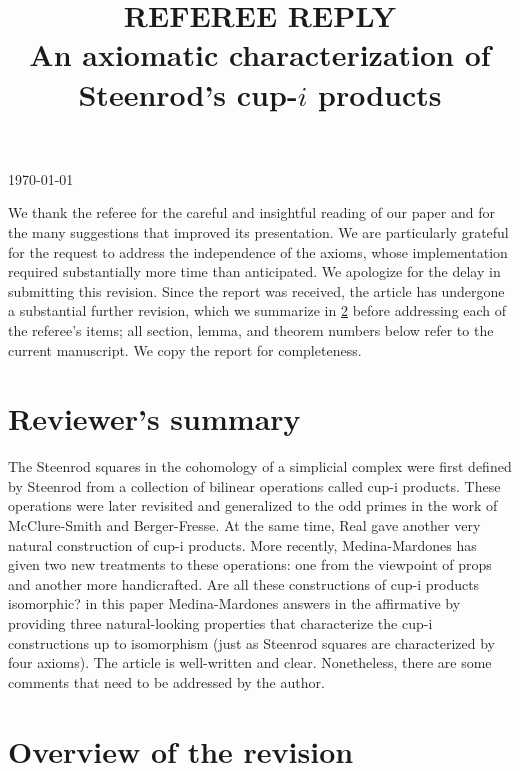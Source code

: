 \documentclass{amsart}
\title[Referee reply]{REFEREE REPLY \\ An axiomatic characterization of Steenrod's cup-$i$ products}
\begin{document}
	\noindent\today
	\maketitle

	We thank the referee for the careful and insightful reading of our paper and for the many suggestions that improved its presentation.
	We are particularly grateful for the request to address the independence of the axioms, whose implementation required substantially more time than anticipated.
	We apologize for the delay in submitting this revision.
	Since the report was received, the article has undergone a substantial further revision, which we summarize in \cref{s:overview} before addressing each of the referee's items; all section, lemma, and theorem numbers below refer to the current manuscript.
	We copy the report for completeness.

	\section{Reviewer's summary}

	The Steenrod squares in the cohomology of a simplicial complex were first defined by Steenrod from a collection of bilinear operations called cup-i products.
	These operations were later revisited and generalized to the odd primes in the work of McClure-Smith and Berger-Fresse. At the same time, Real gave another	very natural construction of cup-i products. More recently, Medina-Mardones	has given two new treatments to these operations: one from the viewpoint of props and another more handicrafted.
	Are all these constructions of cup-i products isomorphic? in this paper	Medina-Mardones answers in the affirmative by providing three natural-looking
	properties that characterize the cup-i constructions up to isomorphism (just as	Steenrod squares are characterized by four axioms).
	The article is well-written and clear.
	Nonetheless, there are some comments that need to be addressed by the author.

	\section{Overview of the revision}\label{s:overview}
\end{document}
